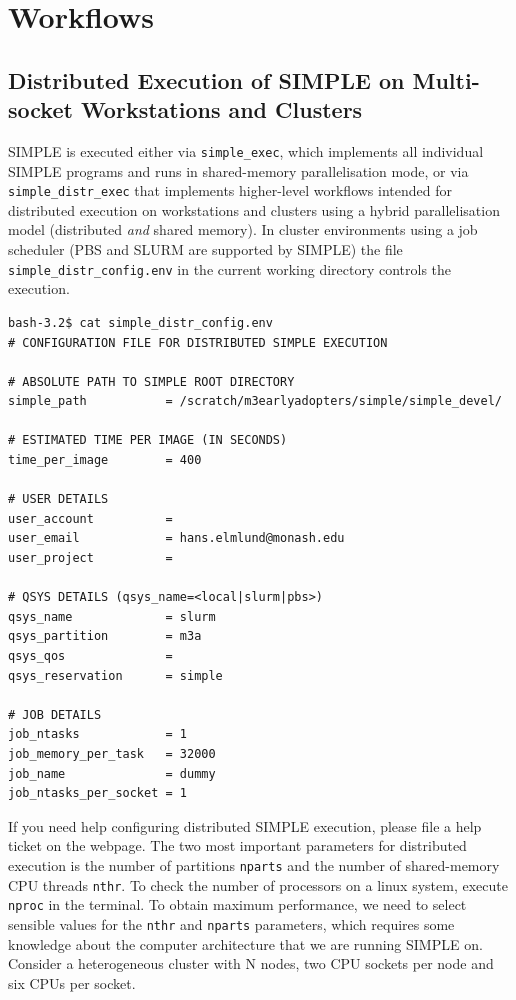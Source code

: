 \documentclass[a4paper,11pt]{article}
\begin{document}
\section{Workflows}

\subsection{Distributed Execution of SIMPLE on Multi-socket Workstations and Clusters}
SIMPLE is executed either via \texttt{simple\_exec}, which implements all individual SIMPLE programs and runs in shared-memory parallelisation mode, or via \texttt{simple\_distr\_exec} that implements higher-level workflows intended for distributed execution on workstations and clusters using a hybrid parallelisation model (distributed \textit{and} shared memory). In cluster environments using a job scheduler (PBS and SLURM are supported by SIMPLE) the file \texttt{simple\_distr\_config.env} in the current working directory controls the execution.
\begin{verbatim}
bash-3.2$ cat simple_distr_config.env 
# CONFIGURATION FILE FOR DISTRIBUTED SIMPLE EXECUTION

# ABSOLUTE PATH TO SIMPLE ROOT DIRECTORY
simple_path           = /scratch/m3earlyadopters/simple/simple_devel/

# ESTIMATED TIME PER IMAGE (IN SECONDS)
time_per_image        = 400

# USER DETAILS
user_account          = 
user_email            = hans.elmlund@monash.edu
user_project          = 

# QSYS DETAILS (qsys_name=<local|slurm|pbs>)
qsys_name             = slurm
qsys_partition        = m3a
qsys_qos              =
qsys_reservation      = simple

# JOB DETAILS
job_ntasks            = 1
job_memory_per_task   = 32000
job_name              = dummy
job_ntasks_per_socket = 1
\end{verbatim}
If you need help configuring distributed SIMPLE execution, please file a help ticket on the webpage. The two most important parameters for distributed execution is the number of partitions \texttt{nparts} and the number of shared-memory CPU threads \texttt{nthr}. To check the number of processors on a linux system, execute \texttt{nproc} in the terminal. To obtain maximum performance, we need to select sensible values for the \texttt{nthr} and \texttt{nparts} parameters, which requires some knowledge about the computer architecture that we are running SIMPLE on.  Consider a heterogeneous cluster with N nodes, two CPU sockets per node and six CPUs per socket.
\end{document}
